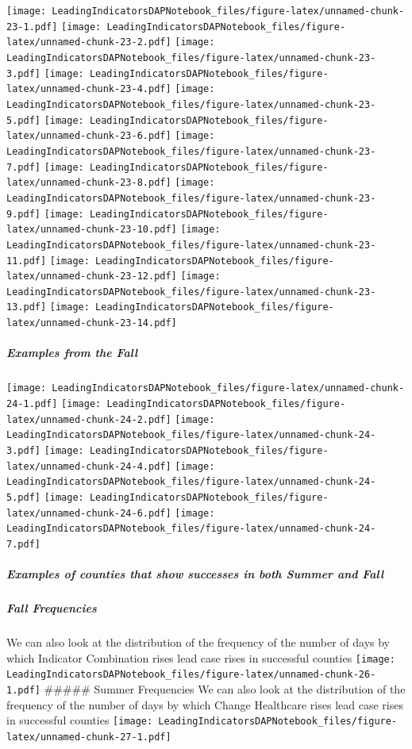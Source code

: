 \documentclass[]{article}
\let\oldsubparagraph\subparagraph
\renewcommand{\subparagraph}[1]{\oldsubparagraph{#1}\mbox{}}
\begin{document}
\texttt{[image: LeadingIndicatorsDAPNotebook\_files/figure-latex/unnamed-chunk-23-1.pdf]}
\texttt{[image: LeadingIndicatorsDAPNotebook\_files/figure-latex/unnamed-chunk-23-2.pdf]}
\texttt{[image: LeadingIndicatorsDAPNotebook\_files/figure-latex/unnamed-chunk-23-3.pdf]}
\texttt{[image: LeadingIndicatorsDAPNotebook\_files/figure-latex/unnamed-chunk-23-4.pdf]}
\texttt{[image: LeadingIndicatorsDAPNotebook\_files/figure-latex/unnamed-chunk-23-5.pdf]}
\texttt{[image: LeadingIndicatorsDAPNotebook\_files/figure-latex/unnamed-chunk-23-6.pdf]}
\texttt{[image: LeadingIndicatorsDAPNotebook\_files/figure-latex/unnamed-chunk-23-7.pdf]}
\texttt{[image: LeadingIndicatorsDAPNotebook\_files/figure-latex/unnamed-chunk-23-8.pdf]}
\texttt{[image: LeadingIndicatorsDAPNotebook\_files/figure-latex/unnamed-chunk-23-9.pdf]}
\texttt{[image: LeadingIndicatorsDAPNotebook\_files/figure-latex/unnamed-chunk-23-10.pdf]}
\texttt{[image: LeadingIndicatorsDAPNotebook\_files/figure-latex/unnamed-chunk-23-11.pdf]}
\texttt{[image: LeadingIndicatorsDAPNotebook\_files/figure-latex/unnamed-chunk-23-12.pdf]}
\texttt{[image: LeadingIndicatorsDAPNotebook\_files/figure-latex/unnamed-chunk-23-13.pdf]}
\texttt{[image: LeadingIndicatorsDAPNotebook\_files/figure-latex/unnamed-chunk-23-14.pdf]}

\hypertarget{examples-from-the-fall-2}{%
\subparagraph{Examples from the Fall}\label{examples-from-the-fall-2}}

\texttt{[image: LeadingIndicatorsDAPNotebook\_files/figure-latex/unnamed-chunk-24-1.pdf]}
\texttt{[image: LeadingIndicatorsDAPNotebook\_files/figure-latex/unnamed-chunk-24-2.pdf]}
\texttt{[image: LeadingIndicatorsDAPNotebook\_files/figure-latex/unnamed-chunk-24-3.pdf]}
\texttt{[image: LeadingIndicatorsDAPNotebook\_files/figure-latex/unnamed-chunk-24-4.pdf]}
\texttt{[image: LeadingIndicatorsDAPNotebook\_files/figure-latex/unnamed-chunk-24-5.pdf]}
\texttt{[image: LeadingIndicatorsDAPNotebook\_files/figure-latex/unnamed-chunk-24-6.pdf]}
\texttt{[image: LeadingIndicatorsDAPNotebook\_files/figure-latex/unnamed-chunk-24-7.pdf]}

\hypertarget{examples-of-counties-that-show-successes-in-both-summer-and-fall-2}{%
\subparagraph{Examples of counties that show successes in both Summer
and
Fall}\label{examples-of-counties-that-show-successes-in-both-summer-and-fall-2}}

\hypertarget{fall-frequencies-1}{%
\subparagraph{Fall Frequencies}\label{fall-frequencies-1}}

We can also look at the distribution of the frequency of the number of
days by which Indicator Combination rises lead case rises in successful
counties
\texttt{[image: LeadingIndicatorsDAPNotebook\_files/figure-latex/unnamed-chunk-26-1.pdf]}
\#\#\#\#\# Summer Frequencies We can also look at the distribution of
the frequency of the number of days by which Change Healthcare rises
lead case rises in successful counties
\texttt{[image: LeadingIndicatorsDAPNotebook\_files/figure-latex/unnamed-chunk-27-1.pdf]}
\end{document}
